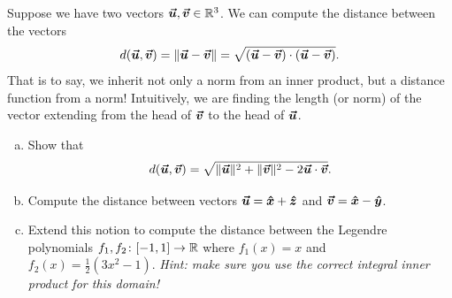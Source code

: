 \documentclass[12pt]{article} %
\begin{document}
\newpage
\begin{problem}
	Suppose we have two vectors $\boldsymbol{\vec{u}},\boldsymbol{\vec{v}} \in \mathbb{R}^3$.  We can compute the distance between the vectors
	\[
	d(\boldsymbol{\vec{u}},\boldsymbol{\vec{v}}) = \|\boldsymbol{\vec{u}}-\boldsymbol{\vec{v}}\| = \sqrt{(\boldsymbol{\vec{u}}-\boldsymbol{\vec{v}})\cdot(\boldsymbol{\vec{u}}-\boldsymbol{\vec{v}})}.
	\]
	That is to say, we inherit not only a norm from an inner product, but a distance function from a norm!  Intuitively, we are finding the length (or norm) of the vector extending from the head of $\boldsymbol{\vec{v}}$ to the head of $\boldsymbol{\vec{u}}$.
	\begin{enumerate}[(a)]
		\item Show that
		\[
		d(\boldsymbol{\vec{u}},\boldsymbol{\vec{v}}) = \sqrt{\|\boldsymbol{\vec{u}}\|^2+\|\boldsymbol{\vec{v}}\|^2-2\boldsymbol{\vec{u}}\cdot \boldsymbol{\vec{v}}}.
		\]
		\item Compute the distance between vectors $\boldsymbol{\vec{u}}=\boldsymbol{\hat{x}} + \boldsymbol{\hat{z}}$ and $\boldsymbol{\vec{v}} = \boldsymbol{\hat{x}} - \boldsymbol{\hat{y}}$.  
		\item Extend this notion to compute the distance between the Legendre polynomials $f_1,f_2\colon [-1,1] \to \mathbb{R}$ where $f_1(x)=x$ and $f_2(x)=\frac{1}{2}\left(3x^2-1\right)$. \emph{Hint: make sure you use the correct integral inner product for this domain!}
	\end{enumerate}
\end{problem}
\begin{solution}

\end{solution}
\end{document}
